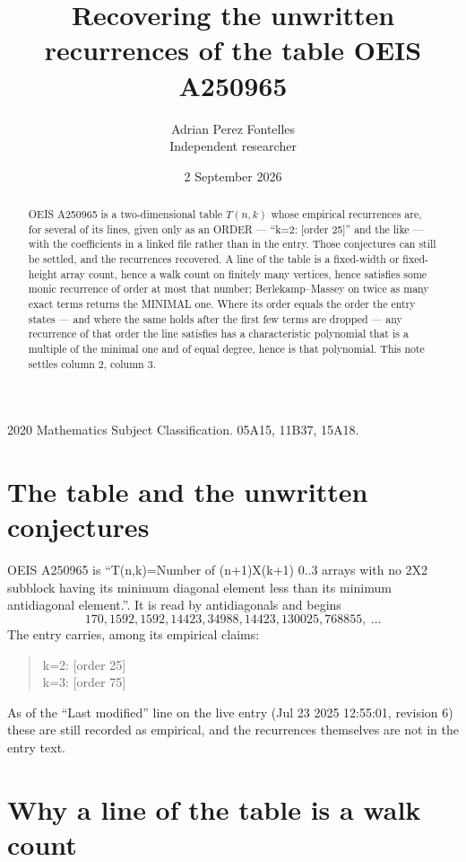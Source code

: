 \documentclass[11pt,a4paper]{article}
\title{Recovering the unwritten recurrences of the table OEIS A250965}
\author{Adrian Perez Fontelles\\ \small Independent researcher}
\date{2 September 2026}
\theoremstyle{plain}
\theoremstyle{definition}
\begin{document}
\maketitle

\begin{abstract}
OEIS A250965 is a two-dimensional table $T(n,k)$ whose empirical recurrences are, for several of
its lines, given only as an ORDER --- ``k=2: [order 25]'' and the like --- with the
coefficients in a linked file rather than in the entry. Those conjectures can still be settled,
and the recurrences recovered. A line of the table is a fixed-width or fixed-height array
count, hence a walk count on finitely many vertices, hence satisfies some monic recurrence of
order at most that number; Berlekamp--Massey on twice as many exact terms returns the MINIMAL
one. Where its order equals the order the entry states --- and where the same holds after the
first few terms are dropped --- any recurrence of that order the line satisfies has a
characteristic polynomial that is a multiple of the minimal one and of equal degree, hence is
that polynomial. This note settles column 2, column 3.
\end{abstract}

\noindent\small 2020 Mathematics Subject Classification. 05A15, 11B37, 15A18.\normalsize

\section{The table and the unwritten conjectures}

OEIS A250965 is ``T(n,k)=Number of (n+1)X(k+1) 0..3 arrays with no 2X2 subblock having its minimum diagonal element less than its minimum antidiagonal element.''. It is read by antidiagonals and begins
\[
170, 1592, 1592, 14423, 34988, 14423, 130025, 768855,\ \dots
\]
The entry carries, among its empirical claims:
\begin{quote}\small
k=2: [order 25]\\
k=3: [order 75]
\end{quote}
As of the ``Last modified'' line on the live entry (Jul 23 2025 12:55:01, revision 6) these are still
recorded as empirical, and the recurrences themselves are not in the entry text.

\section{Why a line of the table is a walk count}
\end{document}
